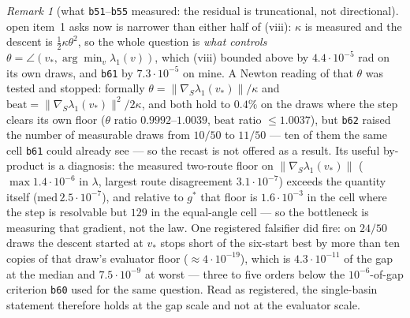 \documentclass[11pt]{article}
\theoremstyle{remark}
\newtheorem{remark}{Remark}[section]
\begin{document}
\begin{remark}[what \texttt{b51}--\texttt{b55} measured: the residual is truncational, not directional]
open item~1 asks now is narrower than either half of (viii): $\kappa$ is measured and the descent is
$\tfrac12\kappa\theta^2$, so the whole question is \emph{what controls $\theta=\angle(v_\ast,\arg\min_v\lambda_1(v))$},
which (viii) bounded above by $4.4\cdot10^{-5}$ rad on its own draws, and \texttt{b61} by
$7.3\cdot10^{-5}$ on mine. A Newton reading of that $\theta$ was tested and stopped: formally
$\theta=\|\nabla_{\!S}\lambda_1(v_\ast)\|/\kappa$ and $\text{beat}=\|\nabla_{\!S}\lambda_1(v_\ast)\|^2/2\kappa$,
and both hold to $0.4\%$ on the draws where the step clears its own floor ($\theta$ ratio
$0.9992$--$1.0039$, $\text{beat}$ ratio $\le1.0037$), but \texttt{b62} raised the number of measurable
draws from $10/50$ to $11/50$ --- ten of them the same cell \texttt{b61} could already see --- so the
recast is not offered as a result. Its useful by-product is a diagnosis: the measured two-route floor
on $\|\nabla_{\!S}\lambda_1(v_\ast)\|$ ($\max1.4\cdot10^{-6}$ in $\lambda$, largest route disagreement
$3.1\cdot10^{-7}$) exceeds the quantity itself ($\mathrm{med}\,2.5\cdot10^{-7}$), and relative to $g^{\ast}$
that floor is $1.6\cdot10^{-3}$ in the cell where the step is resolvable but $129$ in the equal-angle cell
--- so the bottleneck is measuring that gradient, not the law. One
registered falsifier did fire: on $24/50$ draws the descent started at $v_\ast$ stops short of the
six-start best by more than ten copies of that draw's evaluator floor ($\approx4\cdot10^{-19}$), which
is $4.3\cdot10^{-11}$ of the gap at the median and $7.5\cdot10^{-9}$ at worst --- three to five orders
below the $10^{-6}$-of-gap criterion \texttt{b60} used for the same question. Read as registered, the
single-basin statement therefore holds at the gap scale and not at the evaluator scale.


\end{remark}
\end{document}
